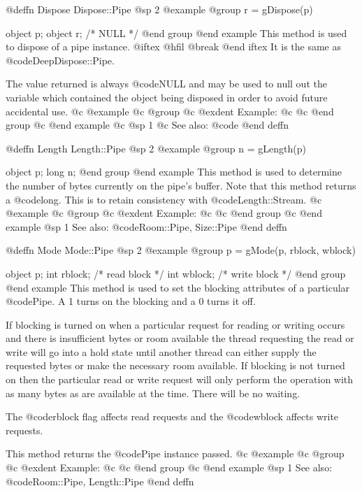 @deffn {Dispose} Dispose::Pipe
@sp 2
@example
@group
r = gDispose(p)

object  p;
object  r;     /*  NULL  */
@end group
@end example
This method is used to dispose of a pipe instance.  
@iftex
@hfil @break 
@end iftex
It is the same as @code{DeepDispose::Pipe}.

The value returned is always @code{NULL} and may be used to null out
the variable which contained the object being disposed in order to
avoid future accidental use.
@c @example
@c @group
@c @exdent Example:
@c 
@c @end group
@c @end example
@c @sp 1
@c See also:  @code{}
@end deffn








@deffn {Length} Length::Pipe
@sp 2
@example
@group
n = gLength(p)

object  p;
long    n;
@end group
@end example
This method is used to determine the number of bytes currently on
the pipe's buffer.  Note that this method returns a @code{long}.
This is to retain consistency with @code{Length::Stream}.
@c @example
@c @group
@c @exdent Example:
@c 
@c @end group
@c @end example
@sp 1
See also:  @code{Room::Pipe, Size::Pipe}
@end deffn







@deffn {Mode} Mode::Pipe
@sp 2
@example
@group
p = gMode(p, rblock, wblock)

object  p;
int     rblock;   /*  read block   */
int     wblock;   /*  write block  */
@end group
@end example
This method is used to set the blocking attributes of a particular
@code{Pipe}.  A 1 turns on the blocking and a 0 turns it off.

If blocking is turned on when a particular request for reading or
writing occurs and there is insufficient bytes or room available
the thread requesting the read or write will go into a hold state
until another thread can either supply the requested bytes or
make the necessary room available.  If blocking is not turned on
then the particular read or write request will only perform the
operation with as many bytes as are available at the time.  There
will be no waiting.

The @code{rblock} flag affects read requests and the @code{wblock}
affects write requests.

This method returns the @code{Pipe} instance passed.
@c @example
@c @group
@c @exdent Example:
@c 
@c @end group
@c @end example
@sp 1
See also:  @code{Room::Pipe, Length::Pipe}
@end deffn









